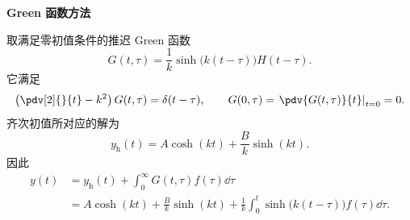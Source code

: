 \begin{question}
\begin{solution}
\textbf{Green 函数方法}\par

取满足零初值条件的推迟 Green 函数
\[
G(t,\tau)=\frac1k\sinh\bigl(k(t-\tau)\bigr)H(t-\tau).
\]
它满足
\[
\left(\pdv[2]{}{t}-k^2\right)G(t,\tau)=\delta(t-\tau),
\qquad
G(0,\tau)=\left.\pdv{G(t,\tau)}{t}\right|_{t=0}=0.
\]
齐次初值所对应的解为
\[
y_{\mathrm h}(t)=A\cosh(kt)+\frac{B}{k}\sinh(kt).
\]
因此
\[
\begin{aligned}
y(t)
&=y_{\mathrm h}(t)+\int_0^\infty G(t,\tau)f(\tau)\dd{\tau}\\
&=A\cosh(kt)+\frac{B}{k}\sinh(kt)
  +\frac1k\int_0^t\sinh\bigl(k(t-\tau)\bigr)f(\tau)\dd{\tau}.
\end{aligned}
\]
\end{solution}
\end{question}
